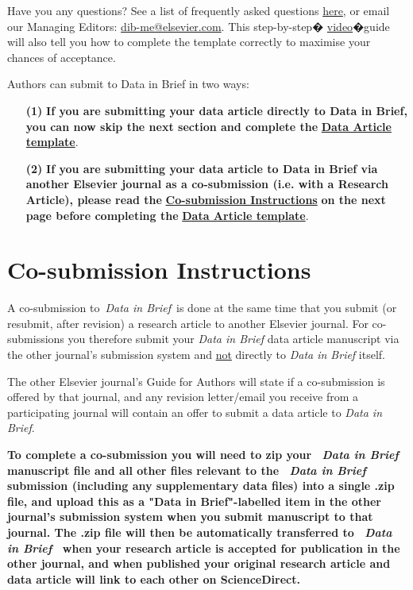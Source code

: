 \documentclass[times,final]{elsarticle.cls}
\begin{document}
Have you any questions? See a list of frequently asked questions 
\href{https://www.journals.elsevier.com/data-in-brief/about-data-in-brief/data-in-brief-faq}{here},
or email our Managing Editors:  
\href{mailto:dib-me@elsevier.com}{dib-me@elsevier.com}. This
step-by-step�
\href{https://www.journals.elsevier.com/data-in-brief/about-data-in-brief/how-to-submit-your-research-data-article-data-in-brief}%
{video}�guide will also tell you how to complete the
template correctly to maximise your chances of acceptance.

\vskip6pt
\noindent Authors can submit to Data in Brief in two ways:

\begin{enumerate}
\item[\bf(1)] \textbf{If you are submitting your data article directly to Data in
Brief, you can now skip the next section and complete the} 
\hyperlink{target2}{\textbf{Data Article template}}.

\item[\bf(2)] \textbf{If you are submitting your data article to Data in Brief via
another Elsevier journal as a co-submission (i.e. with a Research
Article), please read the} \hyperlink{target3}{\textbf{Co-submission Instructions}}
\textbf{on the next page
before completing the} \hyperlink{target2}{\textbf{Data Article template}}.

\end{enumerate}

\hypertarget{target3}{}
\section*{Co-submission Instructions}
A co-submission to~\textit{Data in Brief}~is done at the same time that you
submit (or resubmit, after revision) a research article to another
Elsevier journal. For co-submissions you therefore submit your 
\textit{Data in Brief} data article manuscript via the other journal's 
submission system and \underline{not} directly to 
\textit{Data in Brief} itself. 

\vskip6pt\noindent
The other Elsevier journal's Guide for Authors will state if a
co-submission is offered by that journal, and any revision letter/email
you receive from a participating journal will contain an offer to
submit a data article to \textit{Data in Brief}.

\vskip6pt\noindent
\textbf{To complete a co-submission you will need to zip your
~\textit{Data in Brief}~
manuscript file and all other files relevant to the 
~\textit{Data in Brief}~
submission (including any supplementary data files) into a single .zip
file, and upload this as a "Data in Brief"-labelled item in the other
journal's submission system when you submit manuscript to that journal.
The .zip file will then be automatically transferred to 
~\textit{Data in Brief}~
when your research article is accepted for publication in the other
journal, and when published your original research article and data
article will link to each other on ScienceDirect.}
\end{document}
